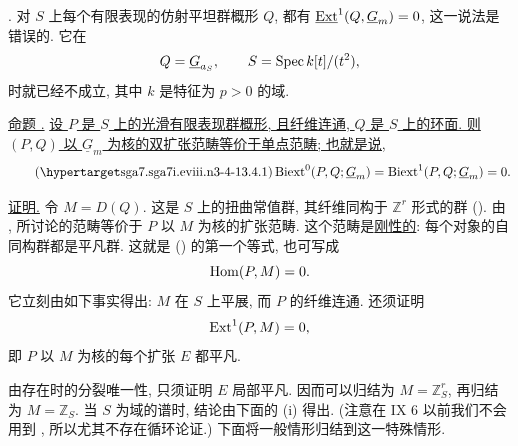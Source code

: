 \medskip
\noindent {}. 对 $S$ 上每个有限表现的仿射平坦群概形 $Q$, 都有 $\uExt^1(Q,\underline G_m)=0$, 这一说法是错误的. 它在
\[
 Q=\underline G_{a_S},\qquad
 S=\Spec k[t]/(t^2),
\]
时就已经不成立, 其中 $k$ 是特征为 $p>0$ 的域.




\medskip
\noindent\underline{命题 .} \underline{设 $P$ 是 $S$ 上的光滑有限表现群概形, 且纤维连通, $Q$ 是 $S$ 上的环面. 则 $(P,Q)$ 以 $\underline G_m$ 为核的双扩张范畴等价于单点范畴; 也就是说,}
\begin{equation}\tag{\SGARefTarget{sga7.sga7i.eviii.n3-4-1}{3.4.1}}
 \Biext^0(P,Q;\underline G_m)=
 \Biext^1(P,Q;\underline G_m)=0.
\end{equation}

\noindent\underline{证明.} 令 $M=D(Q)$. 这是 $S$ 上的扭曲常值群, 其纤维同构于 $\mathbb Z^r$ 形式的群 (). 由 , 所讨论的范畴等价于 $P$ 以 $M$ 为核的扩张范畴. 这个范畴是\underline{刚性的}: 每个对象的自同构群都是平凡群. 这就是 () 的第一个等式, 也可写成
\[
 \operatorname{Hom}(P,M)=0.
\]
它立刻由如下事实得出: $M$ 在 $S$ 上平展, 而 $P$ 的纤维连通. 还须证明
\[
 \operatorname{Ext}^1(P,M)=0,
\]
即 $P$ 以 $M$ 为核的每个扩张 $E$ 都平凡.

由存在时的分裂唯一性, 只须证明 $E$ 局部平凡. 因而可以归结为 $M=\mathbb Z_S^r$, 再归结为 $M=\mathbb Z_S$. 当 $S$ 为域的谱时, 结论由下面的  (i) 得出. (注意在 IX 6 以前我们不会用到 , 所以尤其不存在循环论证.) 下面将一般情形归结到这一特殊情形.

